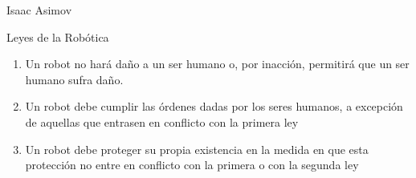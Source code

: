 
\begin{frame}[fragile]{ Isaac Asimov }
\vspace{8px}
\pause
{}
\begin{block}{Leyes de la Robótica}
	\begin{enumerate}
		\item Un robot no hará daño a un ser humano o, por inacción, permitirá que un ser humano sufra daño.
		\pause
		\item Un robot debe cumplir las órdenes dadas por los seres humanos, a excepción de aquellas que entrasen en conflicto con la primera ley
		\pause
		\item Un robot debe proteger su propia existencia en la medida en que esta protección no entre en conflicto con la primera o con la segunda ley
	\end{enumerate}
\end{block}
\end{frame}



